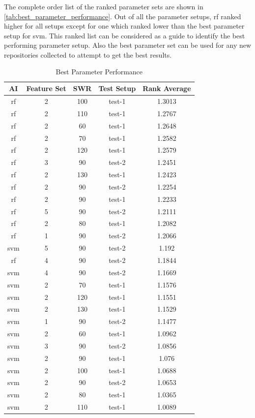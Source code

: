 The complete order list of the ranked parameter sets are shown in \autoref{tab:best_parameter_performance}. Out of all the parameter setups, \gls{rf} ranked higher for all setups except for one which ranked lower than the best parameter setup for \gls{svm}. This ranked list can be considered as a guide to identify the best performing parameter setup. Also the best parameter set can be used for any new repositories collected to attempt to get the best results.

\begin{table}
\begin{center}
    \begin{tabular}{|c|c|c|c|c|}
        \hline
        \textbf{AI} & \textbf{Feature Set} & \textbf{SWR} & \textbf{Test Setup} & \textbf{Rank Average} \\
        \hline
        rf & 2 & 100 & test-1 & 1.3013 \\
        rf & 2 & 110 & test-1 & 1.2767 \\
        rf & 2 & 60 & test-1 & 1.2648 \\
        rf & 2 & 70 & test-1 & 1.2582 \\
        rf & 2 & 120 & test-1 & 1.2579 \\
        rf & 3 & 90 & test-2 & 1.2451 \\
        rf & 2 & 130 & test-1 & 1.2423 \\
        rf & 2 & 90 & test-2 & 1.2254 \\
        rf & 2 & 90 & test-1 & 1.2233 \\
        rf & 5 & 90 & test-2 & 1.2111 \\
        rf & 2 & 80 & test-1 & 1.2082 \\
        rf & 1 & 90 & test-2 & 1.2066 \\
        svm & 5 & 90 & test-2 & 1.192 \\
        rf & 4 & 90 & test-2 & 1.1844 \\
        svm & 4 & 90 & test-2 & 1.1669 \\
        svm & 2 & 70 & test-1 & 1.1576 \\
        svm & 2 & 120 & test-1 & 1.1551 \\
        svm & 2 & 130 & test-1 & 1.1529 \\
        svm & 1 & 90 & test-2 & 1.1477 \\
        svm & 2 & 60 & test-1 & 1.0962 \\
        svm & 3 & 90 & test-2 & 1.0856 \\
        svm & 2 & 90 & test-1 & 1.076 \\
        svm & 2 & 100 & test-1 & 1.0688 \\
        svm & 2 & 90 & test-2 & 1.0653 \\
        svm & 2 & 80 & test-1 & 1.0365 \\
        svm & 2 & 110 & test-1 & 1.0089 \\
        \hline
    \end{tabular}
\end{center}
\caption{Best Parameter Performance}
\label{tab:best_parameter_performance}
\end{table}

